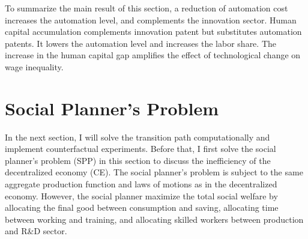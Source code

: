 \documentclass[12pt]{article}
\begin{document}
To summarize the main result of this section, a reduction of automation cost increases the automation level, and complements the innovation sector. Human capital accumulation complements innovation patent but substitutes automation patents. It lowers the automation level and increases the labor share. The increase in the human capital gap amplifies the effect of technological change on wage inequality. 

\section{Social Planner's Problem }
In the next section, I will solve the transition path computationally and implement counterfactual experiments. Before that, I first solve the social planner's problem (SPP) in this section to discuss the inefficiency of the decentralized economy (CE). The social planner's problem is subject to the same aggregate production function and laws of motions as in the decentralized economy. However, the social planner maximize the total social welfare by allocating the final good between consumption and saving, allocating time between working and training, and allocating skilled workers between production and R\&D sector. 
\end{document}
